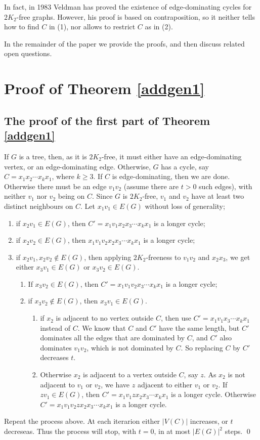 \documentclass[runningheads,a4paper]{llncs}
\begin{document}
In fact, in 1983 Veldman \cite{veldman83} has proved the existence of
edge-dominating cycles for $2K_2$-free graphs. However, his proof is based on
contraposition, so it neither tells how to find $C$ in (1), nor
allows to restrict $C$ as in (2).

In the remainder of the paper we provide the proofs, and then discuss related 
open questions.


\section{Proof of Theorem \ref{addgen1}}

\subsection{The proof of the first part of Theorem \ref{addgen1}}
If $G$ is a tree, then, as it is $2K_2$-free, it must either have an edge-dominating
vertex, or an edge-dominating edge.
Otherwise, $G$ has a cycle, say $C=x_1x_2\cdots x_kx_1$, where $k\ge3$.
If $C$ is edge-dominating, then we are done. 
Otherwise
there must be an edge $v_1v_2$ (assume there are $t>0$ such edges), 
with neither $v_1$ nor $v_2$ being on $C$. 
Since $G$ is $2K_2$-free, $v_1$ and $v_2$ have at least two distinct neighbours on $C$. 
Let $x_1v_1\in E(G)$ without loss of generality; 
\begin{enumerate}
\item if $x_2v_1\in E(G)$, then $C'=x_1v_1x_2x_3\cdots x_kx_1$ is a longer cycle;
\item if $x_2v_2\in E(G)$, then $x_1v_1v_2x_2x_3\cdots x_kx_1$ is a longer cycle; 
\item if $x_2v_1,x_2v_2\not\in E(G)$, then applying $2K_2$-freeness to $v_1v_2$ and $x_2x_3$, 
we get either $x_3v_1\in E(G)$ or $x_3v_2\in E(G)$.
\begin{enumerate}
\item If $x_3v_2\in E(G)$, then $C'=x_1v_1v_2x_3\cdots x_kx_1$ is a longer cycle;
\item if $x_3v_2\not\in E(G)$, then $x_3v_1\in E(G)$.
\begin{enumerate}
\item if $x_2$ is adjacent to no vertex outside $C$, then use $C'=x_1v_1x_3\cdots x_kx_1$ instead of $C$. 
We know that $C$ and $C'$ have the same length, but $C'$ dominates all the edges that
are dominated by $C$, and $C'$ also dominates $v_1v_2$, which is not dominated by $C$. So replacing $C$ by $C'$
decreases $t$.
\item Otherwise $x_2$ is adjacent to a vertex outside $C$, say $z$.
As $x_2$ is not adjacent to $v_1$ or $v_2$, we have $z$ adjacent to either $v_1$ or $v_2$. If $zv_1\in E(G)$, then $C'=x_1v_1zx_2x_3\cdots x_kx_1$ is a longer cycle.
Otherwise $C'=x_1v_1v_2zx_2x_3\cdots x_kx_1$ is a longer cycle.
\end{enumerate}
\end{enumerate}
\end{enumerate}
Repeat the process above. At each iterarion either $|V(C)|$ increases, or $t$ decreseas.
Thus the process will stop, with $t=0$, in at most $|E(G)|^2$ steps. 
\qed
\end{document}
